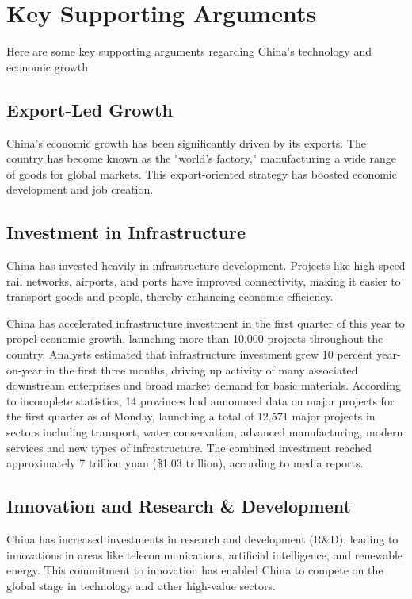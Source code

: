 \chapter{Key Supporting Arguments}

Here are some key supporting arguments regarding China's 
technology and economic growth

\section{Export-Led Growth}

China's economic growth has been significantly driven by its 
exports. The country has become known as the "world's factory," 
manufacturing a wide range of goods for global markets. This 
export-oriented strategy has boosted economic development 
and job creation.

\section{Investment in Infrastructure}

China has invested heavily in infrastructure development. 
Projects like high-speed rail networks, airports, and ports 
have improved connectivity, making it easier to transport 
goods and people, thereby enhancing economic efficiency.

China has accelerated infrastructure investment in the first 
quarter of this year to propel economic growth, launching 
more than 10,000 projects throughout the country.
Analysts estimated that infrastructure investment grew 10 
percent year-on-year in the first three months, driving up 
activity of many associated downstream enterprises and broad 
market demand for basic materials.
According to incomplete statistics, 14 provinces had announced 
data on major projects for the first quarter as of Monday, 
launching a total of 12,571 major projects in sectors including 
transport, water conservation, advanced manufacturing, modern 
services and new types of infrastructure.
The combined investment reached approximately 7 trillion yuan 
(\$1.03 trillion), according to media reports.


\section{Innovation and Research \& Development}

China has increased investments in research and development 
(R\&D), leading to innovations in areas like telecommunications, 
artificial intelligence, and renewable energy. This commitment 
to innovation has enabled China to compete on the global stage 
in technology and other high-value sectors.

